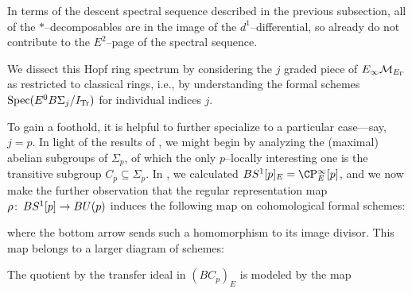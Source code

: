 \begin{remark}
In terms of the descent spectral sequence described in the previous subsection, all of the \(*\)--decomposables are in the image of the \(d^1\)--differential, so already do not contribute to the \(E^2\)--page of the spectral sequence.
\end{remark}

We dissect this Hopf ring spectrum by considering the \(j\){\th} graded piece of \(E_\infty\mathcal{M}_{E_\Gamma}\) as restricted to classical rings, i.e., by understanding the formal schemes \(\operatorname{Spec} (E^0 B\Sigma_j / I_{\mathrm{Tr}})\) for individual indices \(j\).

\begin{example}
To gain a foothold, it is helpful to further specialize to a particular case---say, \(j = p\).  In light of the results of , we might begin by analyzing the (maximal) abelian subgroups of \(\Sigma_p\), of which the only \(p\)--locally interesting one is the transitive subgroup \(C_p \subseteq \Sigma_p\).  In , we calculated \(BS^1[p]_E = \CP^\infty_E[p]\), and we now make the further observation that the regular representation map \(\rho\colon\thinspace BS^1[p] \to BU(p)\) induces the following map on cohomological formal schemes:
\begin{center}
\end{center}
where the bottom arrow sends such a homomorphism to its image divisor.  This map belongs to a larger diagram of schemes:
\begin{center}
\end{center}
The quotient by the transfer ideal in \((BC_p)_E\) is modeled by the map
\begin{center}
\end{center}
\end{example}
